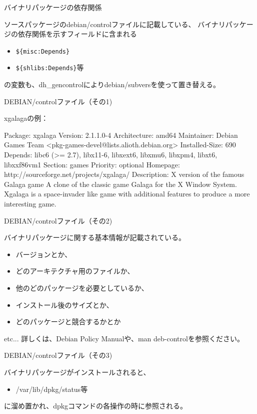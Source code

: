 \begin{frame}[containsverbatim]{バイナリパッケージの依存関係}

ソースパッケージのdebian/controlファイルに記載している、
バイナリパッケージの依存関係を示すフィールドに含まれる
\begin{itemize}
\item \verb!${misc:Depends}!
\item \verb!${shlibs:Depends}!等
\end{itemize}
の変数も、dh\_gencontrolによりdebian/subversを使って置き替える。

\end{frame}


\begin{frame}[containsverbatim]{DEBIAN/controlファイル（その1)}

xgalagaの例：
\begin{commandline}
Package: xgalaga
Version: 2.1.1.0-4
Architecture: amd64
Maintainer: Debian Games Team <pkg-games-devel@lists.alioth.debian.org>
Installed-Size: 690
Depends: libc6 (>= 2.7), libx11-6, libxext6, libxmu6, libxpm4, libxt6, libxxf86vm1
Section: games
Priority: optional
Homepage: http://sourceforge.net/projects/xgalaga/
Description: X version of the famous Galaga game
 A clone of the classic game Galaga for the X Window System.
 Xgalaga is a space-invader like game with additional features to produce
 a more interesting game.
\end{commandline}

\end{frame}

\begin{frame}[containsverbatim]{DEBIAN/controlファイル（その2)}

バイナリパッケージに関する基本情報が記載されている。

\begin{itemize}
\item バージョンとか、
\item どのアーキテクチャ用のファイルか、
\item 他のどのパッケージを必要としているか、
\item インストール後のサイズとか、
\item どのパッケージと競合するかとか
\end{itemize}
etc...
詳しくは、Debian Policy Manualや、man deb-controlを参照ください。
\end{frame}

\begin{frame}[containsverbatim]{DEBIAN/controlファイル（その3)}

バイナリパッケージがインストールされると、
\begin{itemize}
\item /var/lib/dpkg/status等
\end{itemize}

に溜め置かれ、dpkgコマンドの各操作の時に参照される。

\end{frame}


